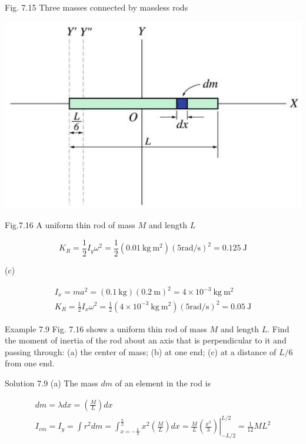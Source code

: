\documentclass[10pt]{article}
\begin{document}
Fig. 7.15 Three masses connected by massless rods

\begin{center}
\includegraphics[max width=\textwidth]{2024_09_13_db1f357d2aad0a03eb2eg-120(1)}
\end{center}

Fig.7.16 A uniform thin rod of mass $M$ and length $L$

$$
K_{R}=\frac{1}{2} I_{y} \omega^{2}=\frac{1}{2}\left(0.01 \mathrm{~kg} \mathrm{~m}^{2}\right)(5 \mathrm{rad} / \mathrm{s})^{2}=0.125 \mathrm{~J}
$$

(c)

$$
\begin{gathered}
I_{x}=m a^{2}=(0.1 \mathrm{~kg})(0.2 \mathrm{~m})^{2}=4 \times 10^{-3} \mathrm{~kg} \mathrm{~m}^{2} \\
K_{R}=\frac{1}{2} I_{x} \omega^{2}=\frac{1}{2}\left(4 \times 10^{-3} \mathrm{~kg} \mathrm{~m}^{2}\right)(5 \mathrm{rad} / \mathrm{s})^{2}=0.05 \mathrm{~J}
\end{gathered}
$$

Example 7.9 Fig. 7.16 shows a uniform thin rod of mass $M$ and length $L$. Find the moment of inertia of the rod about an axis that is perpendicular to it and passing through: (a) the center of mass; (b) at one end; (c) at a distance of $L / 6$ from one end.

Solution 7.9 (a) The mass $d m$ of an element in the rod is

$$
\begin{gathered}
d m=\lambda d x=\left(\frac{M}{L}\right) d x \\
I_{c m}=I_{y}=\int r^{2} d m=\int_{x=-\frac{L}{2}}^{\frac{L}{2}} x^{2}\left(\frac{M}{L}\right) d x=\left.\frac{M}{L}\left(\frac{x^{3}}{3}\right)\right|_{-L / 2} ^{L / 2}=\frac{1}{12} M L^{2}
\end{gathered}
$$
\end{document}
